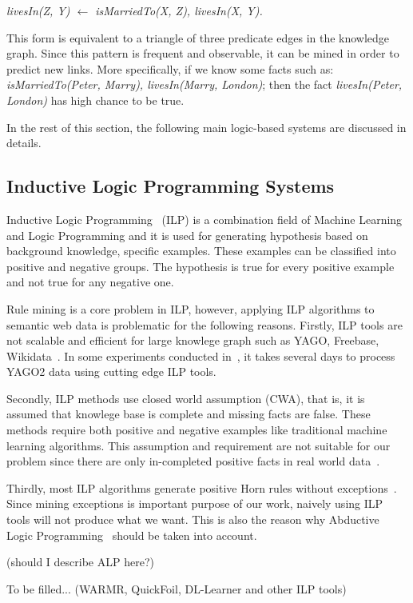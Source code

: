 \centerline{\textit{livesIn(Z, Y) $\leftarrow$ isMarriedTo(X, Z), livesIn(X, Y).}}

This form is equivalent to a triangle of three predicate edges in the knowledge graph. Since this pattern is frequent and observable, it can be mined in order to predict new links. More specifically, if we know some facts such as: \textit{isMarriedTo(Peter, Marry), livesIn(Marry, London)}; then the fact \textit{livesIn(Peter, London)} has high chance to be true.

In the rest of this section, the following main logic-based systems are discussed in details.

\subsection{Inductive Logic Programming Systems}

Inductive Logic Programming~\cite{ref9} (ILP) is a combination field of Machine Learning and Logic Programming and it is used for generating hypothesis based on background knowledge, specific examples. These examples can be classified into positive and negative groups. The hypothesis is true for every positive example and not true for any negative one.

Rule mining is a core problem in ILP, however, applying ILP algorithms to semantic web data is problematic for the following reasons. Firstly, ILP tools are not scalable and efficient for large knowlege graph such as YAGO, Freebase, Wikidata~\cite{ref10}. In some experiments conducted in~\cite{ref10}, it takes several days to process YAGO2 data using cutting edge ILP tools.

Secondly, ILP methods use closed world assumption (CWA), that is, it is assumed that knowlege base is complete and missing facts are false. These methods require both positive and negative examples like traditional machine learning algorithms. This assumption and requirement are not suitable for our problem since there are only in-completed positive facts in real world data~\cite{ref10}.

Thirdly, most ILP algorithms generate positive Horn rules without exceptions~\cite{ref11}. Since mining exceptions is important purpose of our work, naively using ILP tools will not produce what we want. This is also the reason why Abductive Logic Programming~\cite{ref11} should be taken into account.

(should I describe ALP here?)

To be filled... (WARMR, QuickFoil, DL-Learner and other ILP tools)

